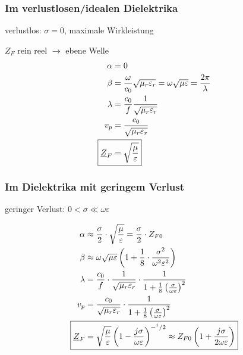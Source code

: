 \subsubsection{Im verlustlosen/idealen Dielektrika}
verlustlos: $\sigma =0$, maximale Wirkleistung

$Z_F$ rein reel $\rightarrow$ ebene Welle
\begin{align*}
    \alpha                  & = 0                                                                                              \\
    \beta                   & = \dfrac{\omega}{c_0}\sqrt{\mu_r\varepsilon_r}=\omega\sqrt{\mu\varepsilon}=\dfrac{2\pi}{\lambda} \\
    \lambda                 & = \dfrac{c_0}{f}\dfrac{1}{\sqrt{\mu_r\varepsilon_r}}                                             \\
    v_p                     & = \dfrac{c_0}{\sqrt{\mu_r\varepsilon_r}}                                                         \\
    \Aboxed{\underline{Z}_F & = \sqrt{\dfrac{\mu}{\varepsilon}}}
\end{align*}

\subsubsection{Im Dielektrika mit geringem Verlust}
geringer Verlust: $0 < \sigma \ll\omega\varepsilon$

\begin{align*}
    \alpha                  & \approx\dfrac{\sigma}{2}\cdot\sqrt{\dfrac{\mu}{\varepsilon}} = \frac{\sigma}{2}\cdot Z_{F0}                                                                \\
    \beta                   & \approx\omega\sqrt{\mu\varepsilon}\left(1+\dfrac{1}{8}\cdot\dfrac{\sigma^2}{\omega^2\varepsilon^2}\right)                                                  \\
    \lambda                 & = \dfrac{c_0}{f}\cdot\dfrac{1}{\sqrt{\mu_r\varepsilon_r}}\cdot\frac{1}{1+\frac{1}{8}\left(\frac{\sigma}{\omega\varepsilon}\right)^2}                       \\
    v_p                     & = \dfrac{c_0}{\sqrt{\mu_r\varepsilon_r}}\cdot\frac{1}{1+\frac{1}{8}\left(\frac{\sigma}{\omega\varepsilon}\right)^2}                                        \\
    \Aboxed{\underline{Z}_F & = \sqrt{\dfrac{\mu}{\varepsilon}}\left(1-\frac{j\sigma}{\omega\varepsilon}\right)^{-^1/2} \approx Z_{F0}\left(1+\frac{j\sigma}{2\omega\varepsilon}\right)}
\end{align*}

